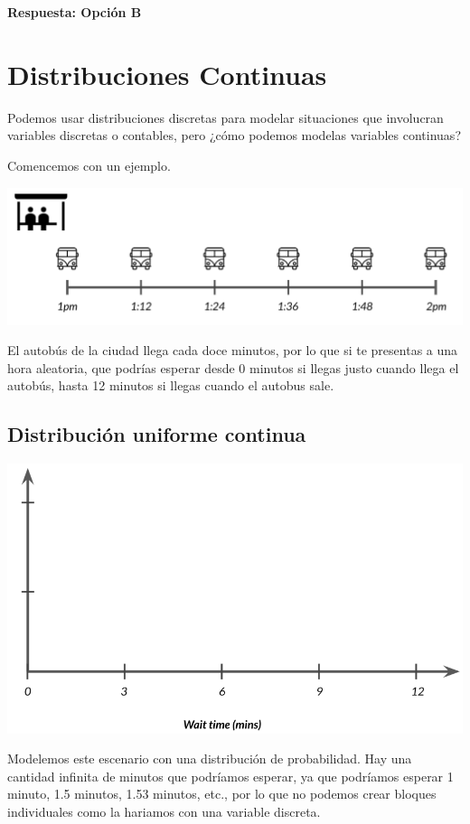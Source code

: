 \documentclass[
  letterpaper,
  DIV=11,
  numbers=noendperiod]{scrreprt}
\begin{document}
\textbf{Respuesta: Opción B}

\hypertarget{distribuciones-continuas}{%
\section{Distribuciones Continuas}\label{distribuciones-continuas}}

Podemos usar distribuciones discretas para modelar situaciones que
involucran variables discretas o contables, pero ¿cómo podemos modelas
variables continuas?

Comencemos con un ejemplo.

\includegraphics{fig28.png}

El autobús de la ciudad llega cada doce minutos, por lo que si te
presentas a una hora aleatoria, que podrías esperar desde 0 minutos si
llegas justo cuando llega el autobús, hasta 12 minutos si llegas cuando
el autobus sale.

\hypertarget{distribuciuxf3n-uniforme-continua}{%
\subsection{Distribución uniforme
continua}\label{distribuciuxf3n-uniforme-continua}}

\includegraphics{fig29.png}

Modelemos este escenario con una distribución de probabilidad. Hay una
cantidad infinita de minutos que podríamos esperar, ya que podríamos
esperar 1 minuto, 1.5 minutos, 1.53 minutos, etc., por lo que no podemos
crear bloques individuales como la hariamos con una variable discreta.
\end{document}
